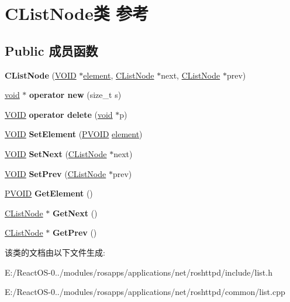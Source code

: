 \hypertarget{class_c_list_node}{}\section{C\+List\+Node类 参考}
\label{class_c_list_node}
\subsection*{Public 成员函数}
\begin{DoxyCompactItemize}
\item 
\mbox{\label{class_c_list_node_a36aa8e8645eeff9a011e84313eac0f1b}} 
{\bfseries C\+List\+Node} (\hyperlink{interfacevoid}{V\+O\+ID} $\ast$\hyperlink{structelement}{element}, \hyperlink{class_c_list_node}{C\+List\+Node} $\ast$next, \hyperlink{class_c_list_node}{C\+List\+Node} $\ast$prev)
\item 
\mbox{\label{class_c_list_node_ab20c1788f23404b9b137765ee30dd0e1}} 
\hyperlink{interfacevoid}{void} $\ast$ {\bfseries operator new} (size\+\_\+t s)
\item 
\mbox{\label{class_c_list_node_a220505e527f432b392f04fa7df3419c6}} 
\hyperlink{interfacevoid}{V\+O\+ID} {\bfseries operator delete} (\hyperlink{interfacevoid}{void} $\ast$p)
\item 
\mbox{\label{class_c_list_node_a900e2996e1e6b8c59623858260b6ca91}} 
\hyperlink{interfacevoid}{V\+O\+ID} {\bfseries Set\+Element} (\hyperlink{interfacevoid}{P\+V\+O\+ID} \hyperlink{structelement}{element})
\item 
\mbox{\label{class_c_list_node_a39e3fe82b408f2adc7b01fd3b6f80d3b}} 
\hyperlink{interfacevoid}{V\+O\+ID} {\bfseries Set\+Next} (\hyperlink{class_c_list_node}{C\+List\+Node} $\ast$next)
\item 
\mbox{\label{class_c_list_node_aa382eb68687a91a81877f0fe6cffb50c}} 
\hyperlink{interfacevoid}{V\+O\+ID} {\bfseries Set\+Prev} (\hyperlink{class_c_list_node}{C\+List\+Node} $\ast$prev)
\item 
\mbox{\label{class_c_list_node_aed58dc07f5d513570c848e13f273b75a}} 
\hyperlink{interfacevoid}{P\+V\+O\+ID} {\bfseries Get\+Element} ()
\item 
\mbox{\label{class_c_list_node_ac0f8943d816de24a99f3ea5d98bbf469}} 
\hyperlink{class_c_list_node}{C\+List\+Node} $\ast$ {\bfseries Get\+Next} ()
\item 
\mbox{\label{class_c_list_node_a0a352fd38004e1772f4a9caa7e3f7d0b}} 
\hyperlink{class_c_list_node}{C\+List\+Node} $\ast$ {\bfseries Get\+Prev} ()
\end{DoxyCompactItemize}


该类的文档由以下文件生成\+:\begin{DoxyCompactItemize}
\item 
E\+:/\+React\+O\+S-\/0../modules/rosapps/applications/net/roshttpd/include/list.\+h\item 
E\+:/\+React\+O\+S-\/0../modules/rosapps/applications/net/roshttpd/common/list.\+cpp\end{DoxyCompactItemize}
